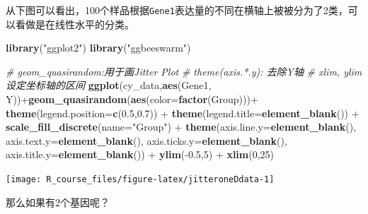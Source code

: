 \documentclass[]{article}
\newenvironment{Shaded}{\begin{snugshade}}{\end{snugshade}}
\newcommand{\KeywordTok}[1]{\textcolor[rgb]{0.13,0.29,0.53}{\textbf{{#1}}}}
\newcommand{\DataTypeTok}[1]{\textcolor[rgb]{0.13,0.29,0.53}{{#1}}}
\newcommand{\DecValTok}[1]{\textcolor[rgb]{0.00,0.00,0.81}{{#1}}}
\newcommand{\FloatTok}[1]{\textcolor[rgb]{0.00,0.00,0.81}{{#1}}}
\newcommand{\StringTok}[1]{\textcolor[rgb]{0.31,0.60,0.02}{{#1}}}
\newcommand{\CommentTok}[1]{\textcolor[rgb]{0.56,0.35,0.01}{\textit{{#1}}}}
\newcommand{\NormalTok}[1]{{#1}}
\numberwithin{figure}{section}
\numberwithin{table}{section}
\theoremstyle{definition}
\theoremstyle{definition}
\theoremstyle{definition}
\theoremstyle{remark}
\begin{document}
从下图可以看出，100个样品根据\texttt{Gene1}表达量的不同在横轴上被被分为了2类，可以看做是在线性水平的分类。

\begin{Shaded}
\begin{Highlighting}[]
\KeywordTok{library}\NormalTok{(}\StringTok{"ggplot2"}\NormalTok{)}
\KeywordTok{library}\NormalTok{(}\StringTok{"ggbeeswarm"}\NormalTok{)}

\CommentTok{# geom_quasirandom:用于画Jitter Plot}
\CommentTok{# theme(axis.*.y): 去除Y轴}
\CommentTok{# xlim, ylim设定坐标轴的区间}
\KeywordTok{ggplot}\NormalTok{(cy_data,}\KeywordTok{aes}\NormalTok{(Gene1, Y))+}\KeywordTok{geom_quasirandom}\NormalTok{(}\KeywordTok{aes}\NormalTok{(}\DataTypeTok{color=}\KeywordTok{factor}\NormalTok{(Group)))+}
\StringTok{    }\KeywordTok{theme}\NormalTok{(}\DataTypeTok{legend.position=}\KeywordTok{c}\NormalTok{(}\FloatTok{0.5}\NormalTok{,}\FloatTok{0.7}\NormalTok{)) +}\StringTok{ }\KeywordTok{theme}\NormalTok{(}\DataTypeTok{legend.title=}\KeywordTok{element_blank}\NormalTok{()) +}\StringTok{ }
\StringTok{    }\KeywordTok{scale_fill_discrete}\NormalTok{(}\DataTypeTok{name=}\StringTok{"Group"}\NormalTok{) +}\StringTok{ }\KeywordTok{theme}\NormalTok{(}\DataTypeTok{axis.line.y=}\KeywordTok{element_blank}\NormalTok{(), }
    \DataTypeTok{axis.text.y=}\KeywordTok{element_blank}\NormalTok{(), }\DataTypeTok{axis.ticks.y=}\KeywordTok{element_blank}\NormalTok{(), }
    \DataTypeTok{axis.title.y=}\KeywordTok{element_blank}\NormalTok{()) +}\StringTok{ }\KeywordTok{ylim}\NormalTok{(-}\FloatTok{0.5}\NormalTok{,}\DecValTok{5}\NormalTok{) +}\StringTok{ }\KeywordTok{xlim}\NormalTok{(}\DecValTok{0}\NormalTok{,}\DecValTok{25}\NormalTok{)}
\end{Highlighting}
\end{Shaded}

\begin{center}\texttt{[image: R\_course\_files/figure-latex/jitteroneDdata-1]} \end{center}

那么如果有2个基因呢？
\end{document}
